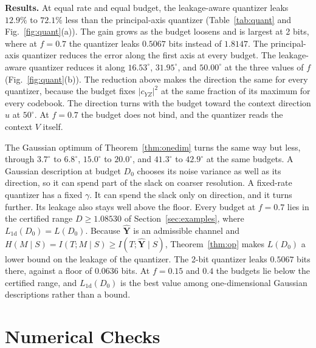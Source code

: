 \documentclass[11pt,onecolumn]{IEEEtran}
\newcommand{\hY}{\hat{\mathbf Y}}
\begin{document}
\textbf{Results.} At equal rate and equal budget, the leakage-aware
quantizer leaks $12.9\%$ to $72.1\%$ less than the principal-axis
quantizer (Table~\ref{tab:quant} and Fig.~\ref{fig:quant}(a)). The gain
grows as the budget loosens and is largest at 2 bits, where at $f=0.7$
the quantizer leaks $0.5067$ bits instead of $1.8147$. The principal-axis
quantizer reduces the error along the first axis at every budget. The
leakage-aware quantizer reduces it along $16.53^\circ$, $31.95^\circ$, and
$50.00^\circ$ at the three values of $f$ (Fig.~\ref{fig:quant}(b)). The
reduction above makes the direction the same for every quantizer, because
the budget fixes $|c_{YZ}|^2$ at the same fraction of its maximum for
every codebook. The direction turns with the budget toward the context
direction $u$ at $50^\circ$. At $f=0.7$ the budget does not bind, and the
quantizer reads the context $V$ itself.

The Gaussian optimum of Theorem~\ref{thm:onedim} turns the same way but
less, through $3.7^\circ$ to $6.8^\circ$, $15.0^\circ$ to $20.0^\circ$, and
$41.3^\circ$ to $42.9^\circ$ at the same budgets. A Gaussian description
at budget $D_0$ chooses its noise variance as well as its direction, so
it can spend part of the slack on coarser resolution. A fixed-rate
quantizer has a fixed $\gamma$. It can spend the slack only on direction,
and it turns further. Its leakage also stays well above the floor. Every
budget at $f=0.7$ lies in the certified range $D\ge1.08530$ of
Section~\ref{sec:examples}, where $L_{\mathrm{1d}}(D_0)=L(D_0)$. Because
$\hY$ is an admissible channel and
$H(M\mid S)=I(T;M\mid S)\ge I(T;\hY\mid S)$, Theorem~\ref{thm:op} makes
$L(D_0)$ a lower bound on the leakage of the quantizer. The 2-bit
quantizer leaks $0.5067$ bits there, against a floor of $0.0636$ bits.
At $f=0.15$ and $0.4$ the budgets lie below the certified range, and
$L_{\mathrm{1d}}(D_0)$ is the best value among one-dimensional Gaussian
descriptions rather than a bound.

\section{Numerical Checks}
\label{app:numver}
\sloppy
\end{document}
